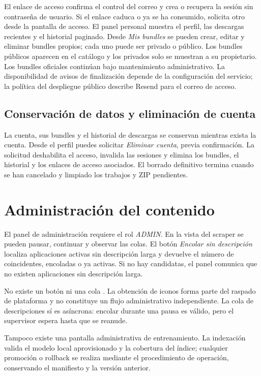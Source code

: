 El enlace de acceso confirma el control del correo y crea o recupera la sesión sin contraseña de usuario. Si el enlace caduca o ya se ha consumido, solicita otro desde la pantalla de acceso. El panel personal muestra el perfil, las descargas recientes y el historial paginado. Desde \emph{Mis bundles} se pueden crear, editar y eliminar bundles propios; cada uno puede ser privado o público. Los bundles públicos aparecen en el catálogo y los privados solo se muestran a su propietario. Los bundles oficiales continúan bajo mantenimiento administrativo. La disponibilidad de avisos de finalización depende de la configuración del servicio; la política del despliegue público describe Resend para el correo de acceso.

\subsection{Conservación de datos y eliminación de cuenta}

La cuenta, sus bundles y el historial de descargas se conservan mientras exista la cuenta. Desde el perfil puedes solicitar \emph{Eliminar cuenta}, previa confirmación. La solicitud deshabilita el acceso, invalida las sesiones y elimina los bundles, el historial y los enlaces de acceso asociados. El borrado definitivo termina cuando se han cancelado y limpiado los trabajos y ZIP pendientes.

\section{Administración del contenido}

El panel de administración requiere el rol \emph{ADMIN}. En la vista del scraper se pueden pausar, continuar y observar las colas. El botón \emph{Encolar sin descripción} localiza aplicaciones activas sin descripción larga y devuelve el número de coincidentes, encoladas o ya activas. Si no hay candidatas, el panel comunica que no existen aplicaciones sin descripción larga.

No existe un botón ni una cola . La obtención de iconos forma parte del raspado de plataforma y no constituye un flujo administrativo independiente. La cola de descripciones sí es asíncrona: encolar durante una pausa es válido, pero el supervisor espera hasta que se reanude.

Tampoco existe una pantalla administrativa de entrenamiento. La indexación valida el modelo local aprovisionado y la cobertura del índice; cualquier promoción o rollback se realiza mediante el procedimiento de operación, conservando el manifiesto y la versión anterior.

